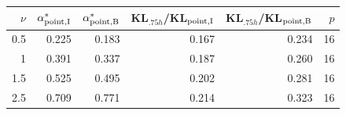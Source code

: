 \begin{tabular}{rrrrrr}
\toprule
$\nu$ & $\alpha^*_{\rm point,I}$ & $\alpha^*_{\rm point,B}$ & KL$_{.75h}$/KL$_{\rm point,I}$ & KL$_{.75h}$/KL$_{\rm point,B}$ & $p$\\
\midrule
0.5 & 0.225 & 0.183 & 0.167 & 0.234 & 16\\
1 & 0.391 & 0.337 & 0.187 & 0.260 & 16\\
1.5 & 0.525 & 0.495 & 0.202 & 0.281 & 16\\
2.5 & 0.709 & 0.771 & 0.214 & 0.323 & 16\\
\bottomrule
\end{tabular}

